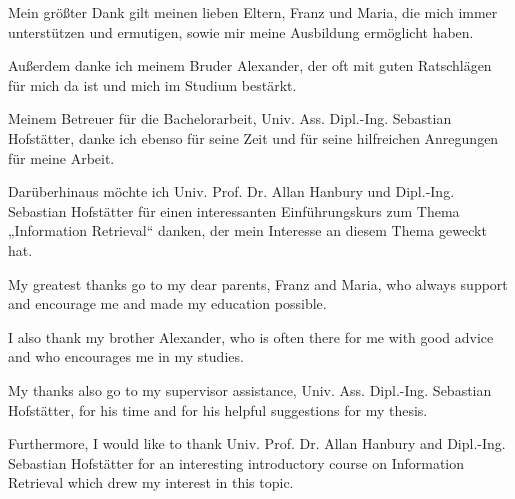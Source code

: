 \documentclass[draft,final]{vutinfth} %
\begin{document}
\frontmatter %

\addstatementpage

\begin{danksagung*}
Mein größter Dank gilt meinen lieben Eltern, Franz und Maria, die mich immer
    unterstützen und ermutigen, sowie mir meine Ausbildung ermöglicht haben.

Außerdem danke ich meinem Bruder Alexander, der oft mit guten Ratschlägen für
    mich da ist und mich im Studium bestärkt.

Meinem Betreuer für die Bachelorarbeit, Univ. Ass. Dipl.-Ing. Sebastian Hofstätter,
    danke ich ebenso für seine Zeit und für seine hilfreichen Anregungen für 
    meine Arbeit.

Darüberhinaus möchte ich Univ. Prof. Dr. Allan Hanbury und 
    Dipl.-Ing. Sebastian Hofstätter für einen interessanten 
    Einführungskurs zum Thema „Information Retrieval“ danken, 
    der mein Interesse an diesem Thema geweckt hat.
\end{danksagung*}

\begin{acknowledgements*}
My greatest thanks go to my dear parents, Franz and Maria, who always support 
    and encourage me and made my education possible. 

I also thank my brother Alexander, who is often there for me with good advice 
    and who encourages me in my studies.

My thanks also go to my supervisor assistance, Univ. Ass. Dipl.-Ing. Sebastian Hofstätter, 
    for his time and for his helpful suggestions for my thesis.

Furthermore, I would like to thank Univ. Prof. Dr. Allan Hanbury 
    and Dipl.-Ing. Sebastian Hofstätter for an interesting introductory 
    course on Information Retrieval which drew my interest in this topic.
\end{acknowledgements*}
\end{document}
